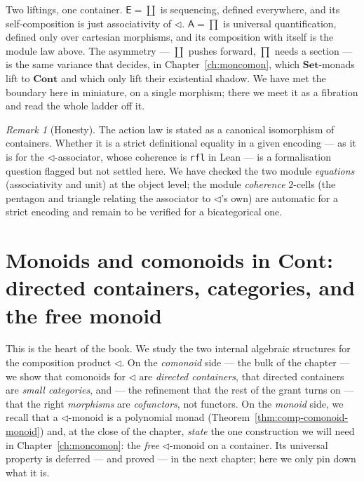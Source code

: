 \documentclass[11pt,a4paper]{book}
\newcommand{\Set}{\mathbf{Set}}
\newcommand{\Cont}{\mathbf{Cont}}
\theoremstyle{plain}
\theoremstyle{definition}
\theoremstyle{remark}
\newtheorem{Remark}[Theorem]{Remark}
\begin{document}
Two liftings, one container. $\mathsf E=\coprod$ is sequencing, defined everywhere,
and its self-composition is just associativity of $\triangleleft$. $\mathsf A=\prod$
is universal quantification, defined only over cartesian morphisms, and its
composition with itself is the module law above. The asymmetry --- $\coprod$ pushes
forward, $\prod$ needs a section --- is the same variance that decides, in
Chapter~\ref{ch:moncomon}, which $\Set$-monads lift to $\Cont$ and which only lift
their existential shadow. We have met the boundary here in miniature, on a single
morphism; there we meet it as a fibration and read the whole ladder off it.

\begin{Remark}[Honesty]
The action law is stated as a canonical isomorphism of containers. Whether it is a
strict definitional equality in a given encoding --- as it is for the
$\triangleleft$-associator, whose coherence is \texttt{rfl} in Lean --- is a
formalisation question flagged but not settled here. We have checked the two module
\emph{equations} (associativity and unit) at the object level; the module
\emph{coherence} $2$-cells (the pentagon and triangle relating the associator to
$\triangleleft$'s own) are automatic for a strict encoding and remain to be
verified for a bicategorical one.
\end{Remark}

\chapter{Monoids and comonoids in \texorpdfstring{$\Cont$}{Cont}: directed containers, categories, and the free monoid}
\label{ch:comonoids}\label{ch:phase2dummy}

This is the heart of the book. We study the two internal algebraic structures for the
composition product $\triangleleft$. On the \emph{comonoid} side --- the bulk of the chapter
--- we show that comonoids for $\triangleleft$ are \emph{directed containers}, that directed
containers are \emph{small categories}, and --- the refinement that the rest of the grant turns
on --- that the right \emph{morphisms} are \emph{cofunctors}, not functors. On the
\emph{monoid} side, we recall that a $\triangleleft$-monoid is a polynomial monad
(Theorem~\ref{thm:comp-comonoid-monoid}) and, at the close of the chapter, \emph{state} the
one construction we will need in Chapter~\ref{ch:moncomon}: the \emph{free}
$\triangleleft$-monoid on a container. Its universal property is deferred --- and proved --- in
the next chapter; here we only pin down what it is.
\end{document}
